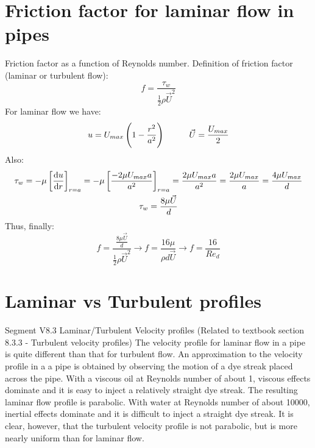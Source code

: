 \documentclass[class=report, crop=false, 12pt,a4paper]{standalone}
\begin{document}
\section{Friction factor for laminar flow in pipes}
Friction factor as a function of Reynolds number. Definition of friction factor (laminar or turbulent flow):
\begin{equation}
  f = \frac{\tau_w}{\frac{1}{2}\rho \vec{U}^2}
\end{equation}
For laminar flow we have:
\begin{equation}
  u = U_{max} \left(1-\frac{r^2}{a^2}\right) \makebox[1cm]{} \vec{U} = \frac{U_{max}}{2}
\end{equation}
Also:
\begin{gather}
  \tau_w = - \mu \left[\frac{\dif u}{\dif r}\right]_{r=a} = -\mu \left[\frac{-2\mu U_{max}a}{a^2}\right]_{r=a} = \frac{2\mu U_{max} a}{a^2} = \frac{2\mu U_{max}}{a} = \frac{4\mu U_{max}}{d}\\
  \tau_w = \frac{8\mu\vec{U}}{d}
\end{gather}
Thus, finally:
\begin{equation}
  f= \frac{\frac{8\mu\vec{U}}{d}}{\frac{1}{2}\rho \vec{U}^2} \rightarrow f = \frac{16\mu}{\rho d \vec{U}} \rightarrow f = \frac{16}{Re_d}
\end{equation}
\section{Laminar vs Turbulent profiles}
Segment V8.3 Laminar/Turbulent Velocity profiles (Related to textbook section 8.3.3 - Turbulent velocity profiles) The velocity profile for laminar flow in a pipe is quite different than that for turbulent flow. An approximation to the velocity profile in a a pipe is obtained by observing the motion of a dye streak placed across the pipe. With a viscous oil at Reynolds number of about 1, viscous effects dominate and it is easy to inject a relatively straight dye streak. The resulting laminar flow profile is parabolic. With water at Reynolds number of about 10000, inertial effects dominate and it is difficult to inject a straight dye streak. It is clear, however, that the turbulent velocity profile is not parabolic, but is more nearly uniform than for laminar flow. 
\end{document}
